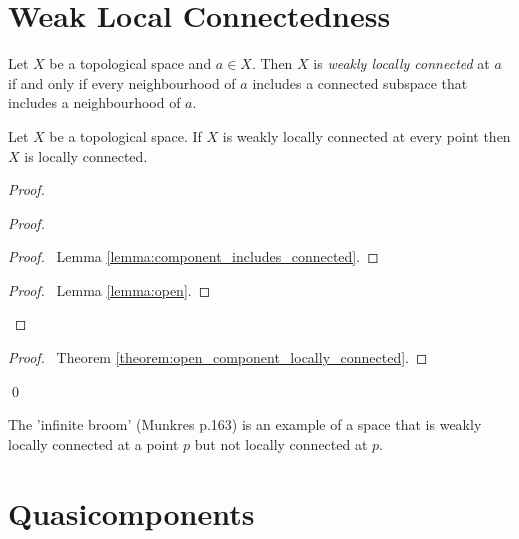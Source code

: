 \section{Weak Local Connectedness}

\begin{definition}
    Let $X$ be a topological space and $a \in X$. Then $X$ is \emph{weakly locally connected} at $a$ if and only if
    every neighbourhood of $a$ includes a connected subspace that includes a neighbourhood of $a$.
\end{definition}

\begin{proposition}
    Let $X$ be a topological space. If $X$ is weakly locally connected at every point then $X$ is locally connected.
\end{proposition}

\begin{proof}
    \pf
    \begin{proof}
        \begin{proof}
            \pf\ Lemma \ref{lemma:component_includes_connected}.
        \end{proof}
        \qedstep
        \begin{proof}
            \pf\ Lemma \ref{lemma:open}.
        \end{proof}
    \end{proof}
    \qedstep
    \begin{proof}
        \pf\ Theorem \ref{theorem:open_component_locally_connected}.
    \end{proof}
    \qed
\end{proof}

\begin{example}
    The 'infinite broom' (Munkres p.163) is an example of a space that is
    weakly locally connected at a point $p$ but not locally connected at $p$.
\end{example}

\section{Quasicomponents}

